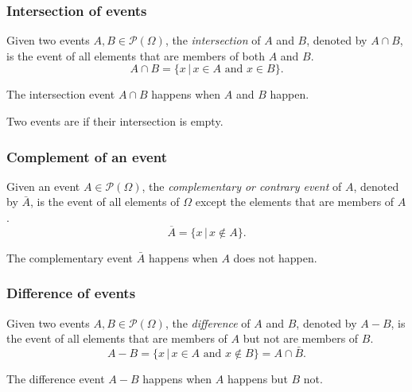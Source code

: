 \begin{frame}
\frametitle{Intersection of events}
\begin{definition}
Given two events $A,B\in \mathcal{P}(\Omega)$, the \emph{intersection} of $A$ and $B$, denoted by $A\cap B$, is the
event of all elements that are members of both $A$ and $B$.
\[
A\cap B = \{x\,|\, x\in A\textrm{ and }x\in B\}.
\]
\end{definition}

\begin{center}

\end{center}
The intersection event $A\cap B$ happens when $A$ \alert{and} $B$ happen.


Two events are  if their intersection is empty.
\end{frame}


\begin{frame}
\frametitle{Complement of an event}
\begin{definition}
Given an event $A\in \mathcal{P}(\Omega)$, the \emph{complementary or contrary event} of $A$, denoted by $\bar A$, is
the event of all elements of $\Omega$ except the elements that are members of $A$.
\[
\overline A = \{x\,|\, x\not\in A\}.
\]
\end{definition}

\begin{center}

\end{center}

The complementary event $\bar A$ happens when $A$ does \alert{not} happen.
\end{frame}


\begin{frame}
\frametitle{Difference of events}
\begin{definition}
Given two events $A,B\in \mathcal{P}(\Omega)$, the \emph{difference} of $A$ and $B$, denoted by $A-B$, is the
event of all elements that are members of $A$ but not are members of $B$.
\[
A-B = \{x\,|\, x\in A\textrm{ and }x\not\in B\} = A \cap \bar B.
\]
\end{definition}

\begin{center}

\end{center}

The difference event $A-B$ happens when $A$ happens but $B$ not.
\end{frame}


